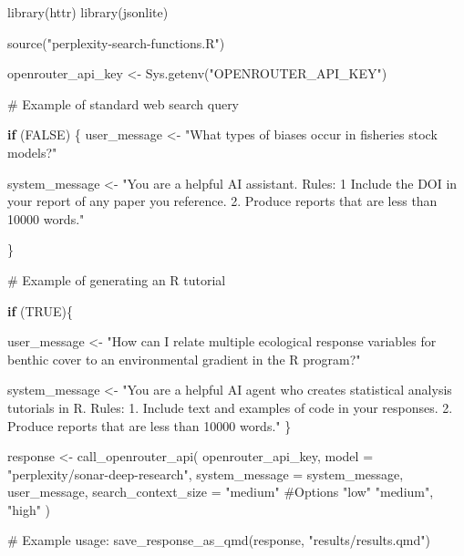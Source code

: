 \documentclass[
  letterpaper,
  DIV=11,
  numbers=noendperiod]{scrreprt}
\newenvironment{Shaded}{\begin{snugshade}}{\end{snugshade}}
\newcommand{\AttributeTok}[1]{\textcolor[rgb]{0.40,0.45,0.13}{#1}}
\newcommand{\CommentTok}[1]{\textcolor[rgb]{0.37,0.37,0.37}{#1}}
\newcommand{\ConstantTok}[1]{\textcolor[rgb]{0.56,0.35,0.01}{#1}}
\newcommand{\ControlFlowTok}[1]{\textcolor[rgb]{0.00,0.23,0.31}{\textbf{#1}}}
\newcommand{\FunctionTok}[1]{\textcolor[rgb]{0.28,0.35,0.67}{#1}}
\newcommand{\NormalTok}[1]{\textcolor[rgb]{0.00,0.23,0.31}{#1}}
\newcommand{\OtherTok}[1]{\textcolor[rgb]{0.00,0.23,0.31}{#1}}
\newcommand{\StringTok}[1]{\textcolor[rgb]{0.13,0.47,0.30}{#1}}
\begin{document}
\begin{Shaded}
\begin{Highlighting}[]
\FunctionTok{library}\NormalTok{(httr)}
\FunctionTok{library}\NormalTok{(jsonlite)}

\FunctionTok{source}\NormalTok{(}\StringTok{"perplexity{-}search{-}functions.R"}\NormalTok{)}

\NormalTok{openrouter\_api\_key }\OtherTok{\textless{}{-}} \FunctionTok{Sys.getenv}\NormalTok{(}\StringTok{"OPENROUTER\_API\_KEY"}\NormalTok{)}

\CommentTok{\# Example of standard web search query}

\ControlFlowTok{if}\NormalTok{ (}\ConstantTok{FALSE}\NormalTok{) \{}
\NormalTok{user\_message }\OtherTok{\textless{}{-}} \StringTok{"What types of biases occur in fisheries stock models?"}

\NormalTok{system\_message }\OtherTok{\textless{}{-}} \StringTok{"You are a helpful AI assistant. }
\StringTok{        Rules: }
\StringTok{        1 Include the DOI in your report of any paper you reference.   }
\StringTok{        2. Produce reports that are less than 10000 words."}

\NormalTok{\}}

\CommentTok{\# Example of generating an R tutorial }

\ControlFlowTok{if}\NormalTok{ (}\ConstantTok{TRUE}\NormalTok{)\{}

\NormalTok{user\_message }\OtherTok{\textless{}{-}} \StringTok{"How can I relate multiple ecological response variables for benthic cover to an environmental gradient in the R program?"}

\NormalTok{system\_message }\OtherTok{\textless{}{-}} \StringTok{"You are a helpful AI agent who creates statistical analysis tutorials in R. }
\StringTok{        Rules: }
\StringTok{        1. Include text and examples of code in your responses. }
\StringTok{        2. Produce reports that are less than 10000 words."}
\NormalTok{\}}


\NormalTok{response }\OtherTok{\textless{}{-}} \FunctionTok{call\_openrouter\_api}\NormalTok{(}
\NormalTok{  openrouter\_api\_key,}
  \AttributeTok{model =} \StringTok{"perplexity/sonar{-}deep{-}research"}\NormalTok{,}
  \AttributeTok{system\_message =}\NormalTok{ system\_message,}
\NormalTok{  user\_message,}
  \AttributeTok{search\_context\_size =} \StringTok{"medium"}
  \CommentTok{\#Options "low"  "medium", "high"}
\NormalTok{)}

\CommentTok{\# Example usage:}
\FunctionTok{save\_response\_as\_qmd}\NormalTok{(response, }\StringTok{"results/results.qmd"}\NormalTok{)}
\end{Highlighting}
\end{Shaded}
\end{document}

